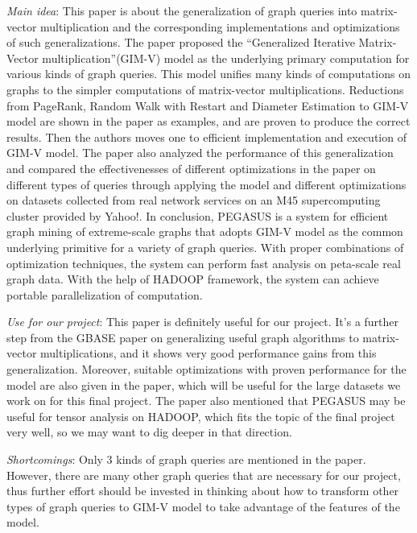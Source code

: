 \begin{itemize*}
\item {\em Main idea}: This paper is about the generalization of graph queries into matrix-vector multiplication and the corresponding implementations and optimizations of such generalizations. The paper proposed the “Generalized Iterative Matrix-Vector multiplication”(GIM-V) model as the underlying primary computation for various kinds of graph queries. This model unifies many kinds of computations on graphs to the simpler computations of matrix-vector multiplications. Reductions from PageRank, Random Walk with Restart and Diameter Estimation to GIM-V model are shown in the paper as examples, and are proven to produce the correct results. Then the authors moves one to efficient implementation and execution of GIM-V model. The paper also analyzed the performance of this generalization and compared the effectivenesses of different optimizations in the paper on different types of queries through applying the model and different optimizations on datasets collected from real network services on an M45 supercomputing cluster provided by Yahoo!. In conclusion, PEGASUS is a system for efficient graph mining of extreme-scale graphs that adopts GIM-V model as the common underlying primitive for a variety of graph queries. With proper combinations of optimization techniques, the system can perform fast analysis on peta-scale real graph data. With the help of HADOOP framework, the system can achieve portable parallelization of computation.\\
\item {\em Use for our project}:
      This paper is definitely useful for our project. It’s a further step from the GBASE paper on generalizing useful graph algorithms to matrix-vector multiplications, and it shows very good performance gains from this generalization. Moreover, suitable optimizations with proven performance for the model are also given in the paper, which will be useful for the large datasets we work on for this final project. The paper also mentioned that PEGASUS may be useful for tensor analysis on HADOOP, which fits the topic of the final project very well, so we may want to dig deeper in that direction.\\
\item {\em Shortcomings}:
      Only 3 kinds of graph queries are mentioned in the paper. However, there are many other graph queries that are necessary for our project, thus further effort should be invested in thinking about how to transform other types of graph queries to GIM-V model to take advantage of the features of the model.
\end{itemize*}



